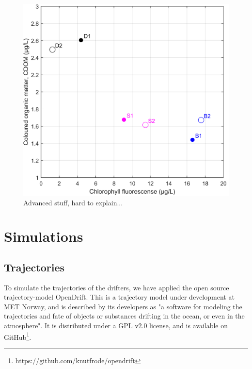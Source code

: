 \documentclass[12pt,a4paper,english]{article}
\begin{document}
\begin{figure}[ht]
\centerline{
\includegraphics*[width=\textwidth]{Figurer/CF_diagram.png}}
\caption{\small
Advanced stuff, hard to explain...}
\label{fig:CFdiagram}
\end{figure}

\clearpage

\section{Simulations}

\subsection{Trajectories}
\label{sect:trajmod}
To simulate the trajectories of the drifters, we have applied the open source trajectory-model OpenDrift. This is a trajectory model under development at MET Norway, and is described by its developers as "a software for modeling the trajectories and fate of objects or substances drifting in the ocean, or even in the atmosphere". It is distributed under a GPL v2.0 license, and is available on GitHub\footnote{https://github.com/knutfrode/opendrift}.
\end{document}
